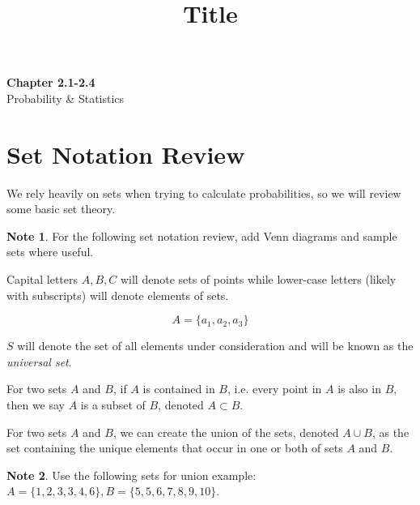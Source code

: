\documentclass[11pt]{article}
\theoremstyle{definition}
\newtheorem{note}{Note}
\begin{document}
\setcounter{section}{8}
\title{Title}

\thispagestyle{empty}

\begin{center}
{\LARGE \bf Chapter 2.1-2.4}\\
{\large Probability \& Statistics}
\end{center}
\section{Set Notation Review}
We rely heavily on sets when trying to calculate probabilities, so we will review some basic set theory.

\begin{note}
	For the following set notation review, add Venn diagrams and sample sets where useful.
\end{note}

Capital letters $A, B, C$ will denote sets of points while lower-case letters (likely with subscripts) will denote elements of sets.

$$
A = \{a_1, a_2, a_3\}
$$

$S$ will denote the set of all elements under consideration and will be known as the \textit{universal set}.

For two sets $A$ and $B$, if $A$ is contained in $B$, i.e. every point in $A$ is also in $B$, then we say $A$ is a subset of $B$, denoted $A \subset B$.

For two sets $A$ and $B$, we can create the union of the sets, denoted $A \cup B$, as the set containing the unique elements that occur in one or both of sets $A$ and $B$.

\begin{note}
	Use the following sets for union example: $A = \{1, 2, 3, 3, 4, 6\},  B = \{5, 5, 6, 7, 8, 9, 10\}$.
\end{note}
\end{document}

